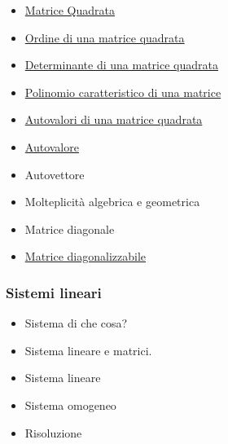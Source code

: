 \begin{itemize}
   \item \href{MatriceQuadrata.pdf}{Matrice Quadrata}
   \item \href{OrdineMatrice.pdf}{Ordine di una matrice quadrata}
   \item \href{DeterminanteMatrice.pdf}{Determinante di una matrice quadrata}
   \item \href{PolinomioMatrice.pdf}{Polinomio caratteristico di una matrice}
   \item \href{AutovaloriMatrice.pdf}{Autovalori di una matrice quadrata}
   \item \href{Autovalore.pdf}{Autovalore}
   \item Autovettore
   \item Molteplicità algebrica e geometrica
   \item Matrice diagonale
   \item \href{MatriceDiagonalizzabile.pdf}{Matrice diagonalizzabile}
\end{itemize}

\subsubsection{Sistemi lineari}
  \begin{itemize}
   \item Sistema di che cosa?
   \item Sistema lineare e matrici.
   \item Sistema lineare
   \item Sistema omogeneo
   \item Risoluzione
  \end{itemize}
  
